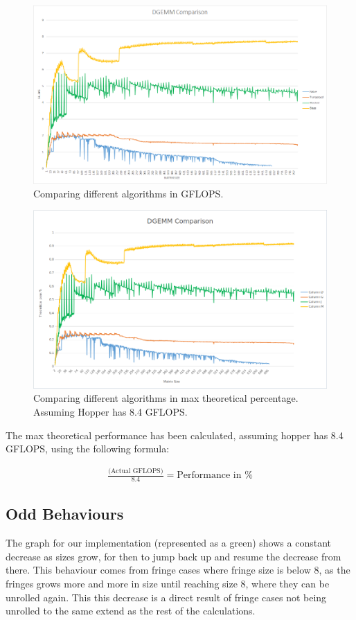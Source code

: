 \documentclass[a4paper,11pt,oneside]{book}
\begin{document}
\begin{figure}[H]
  \centering
  \includegraphics[width=0.9\linewidth]{comparison-graph.png}
  \caption{Comparing different algorithms in GFLOPS.}
  \centering
  \label{fig:sub1}
\end{figure}
\begin{figure}[H]
  \centering
  \includegraphics[width=0.9\linewidth]{comparison-graph-percentage.png}
  \caption{Comparing different algorithms in max theoretical percentage. Assuming Hopper has 8.4 GFLOPS.}
  \centering
  \label{fig:sub1}
\end{figure}

The max theoretical performance has been calculated, assuming hopper has 8.4 GFLOPS, using the following formula:

\begin{align*}
\frac{\text{(Actual GFLOPS)}}{8.4} = \text{Performance in \%}
\end{align*}

\subsection{Odd Behaviours}
The graph for our implementation (represented as a green) shows a constant decrease as sizes grow, for then to jump back up and resume the decrease from there. This behaviour comes from fringe cases where fringe size is below 8, as the fringes grows more and more in size until reaching size 8, where they can be unrolled again. This this decrease is a direct result of fringe cases not being unrolled to the same extend as the rest of the calculations.
\end{document}
